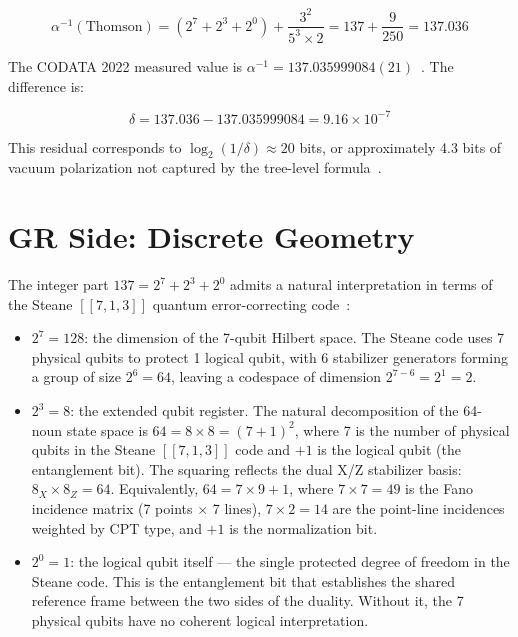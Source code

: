 \documentclass[12pt,a4paper]{article}
\begin{document}
\begin{equation}\label{eq:alpha}
\alpha^{-1}(\text{Thomson}) = (2^7 + 2^3 + 2^0) + \frac{3^2}{5^3 \times 2} = 137 + \frac{9}{250} = 137.036
\end{equation}

The CODATA 2022 measured value is $\alpha^{-1} = 137.035999084(21)$~\cite{codata}. The difference is:

\begin{equation}\label{eq:delta}
\delta = 137.036 - 137.035999084 = 9.16 \times 10^{-7}
\end{equation}

This residual corresponds to $\log_2(1/\delta) \approx 20$ bits, or approximately 4.3 bits of vacuum polarization not captured by the tree-level formula~\cite{gondnok}.

\section{GR Side: Discrete Geometry}

The integer part $137 = 2^7 + 2^3 + 2^0$ admits a natural interpretation in terms of the Steane $[[7,1,3]]$ quantum error-correcting code~\cite{steane}:

\begin{itemize}
  \item $2^7 = 128$: the dimension of the 7-qubit Hilbert space. The Steane code uses 7 physical qubits to protect 1 logical qubit, with 6 stabilizer generators forming a group of size $2^6 = 64$, leaving a codespace of dimension $2^{7-6} = 2^1 = 2$.
  \item $2^3 = 8$: the extended qubit register. The natural decomposition of the 64-noun state space is $64 = 8 \times 8 = (7+1)^2$, where 7 is the number of physical qubits in the Steane $[[7,1,3]]$ code and $+1$ is the logical qubit (the entanglement bit). The squaring reflects the dual X/Z stabilizer basis: $8_X \times 8_Z = 64$. Equivalently, $64 = 7 \times 9 + 1$, where $7 \times 7 = 49$ is the Fano incidence matrix (7 points $\times$ 7 lines), $7 \times 2 = 14$ are the point-line incidences weighted by CPT type, and $+1$ is the normalization bit.
  \item $2^0 = 1$: the logical qubit itself — the single protected degree of freedom in the Steane code. This is the entanglement bit that establishes the shared reference frame between the two sides of the duality. Without it, the 7 physical qubits have no coherent logical interpretation.
\end{itemize}
\end{document}
